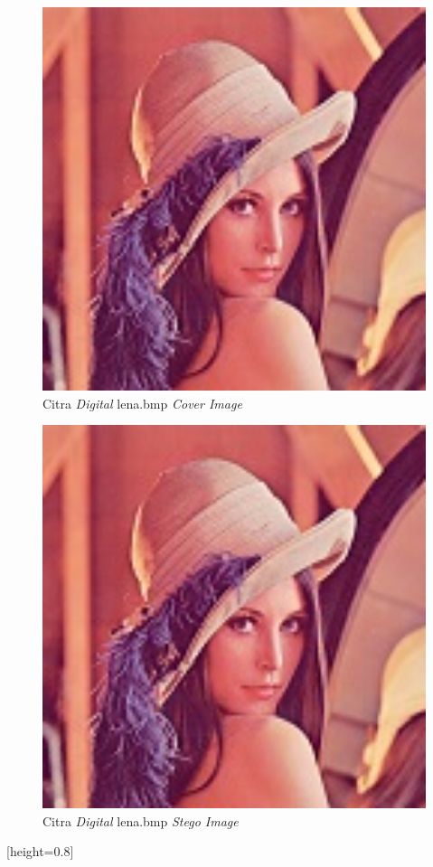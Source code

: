 	\begin{figure}[H]
		\centering
		\includegraphics[width=1\textwidth]{gambar/matlab/lena}
		\caption{Citra \emph{Digital} lena.bmp \emph{Cover Image}}
		\label{lena_asli}
	\end{figure}

	\begin{figure}[H]
		\centering
		\includegraphics[width=1\textwidth]{gambar/matlab/lena_kalimat}
		\caption{Citra \emph{Digital} lena.bmp \emph{Stego Image}}
		\label{lena_pesan}
	\end{figure}
[height=0.8\textheight]
